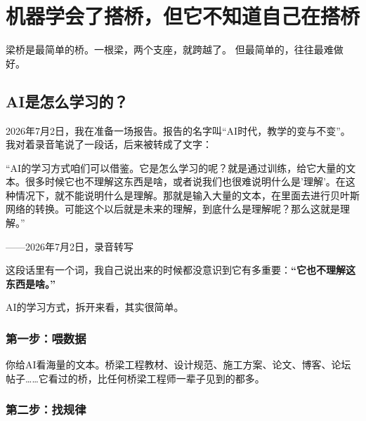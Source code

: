 
\chapter{机器学会了搭桥，但它不知道自己在搭桥}

\vspace{0.5cm}

\begin{center}
{\small\color{muted} 梁桥是最简单的桥。一根梁，两个支座，就跨越了。}
{\small\color{muted} 但最简单的，往往最难做好。}
\end{center}

\vspace{1cm}

\section{AI是怎么学习的？}

2026年7月2日，我在准备一场报告。报告的名字叫“AI时代，教学的变与不变”。我对着录音笔说了一段话，后来被转成了文字：

\begin{shiyu-inline}
“AI的学习方式咱们可以借鉴。它是怎么学习的呢？就是通过训练，给它大量的文本。很多时候它也不理解这东西是啥，或者说我们也很难说明什么是'理解'。在这种情况下，就不能说明什么是理解。那就是输入大量的文本，在里面去进行贝叶斯网络的转换。可能这个以后就是未来的理解，到底什么是理解呢？那么这就是理解。”

\hfill ——2026年7月2日，录音转写
\end{shiyu-inline}

这段话里有一个词，我自己说出来的时候都没意识到它有多重要：\textbf{“它也不理解这东西是啥。”}

AI的学习方式，拆开来看，其实很简单。

\subsection{第一步：喂数据}

你给AI看海量的文本。桥梁工程教材、设计规范、施工方案、论文、博客、论坛帖子\ldots\ldots 它看过的桥，比任何桥梁工程师一辈子见到的都多。

\subsection{第二步：找规律}

